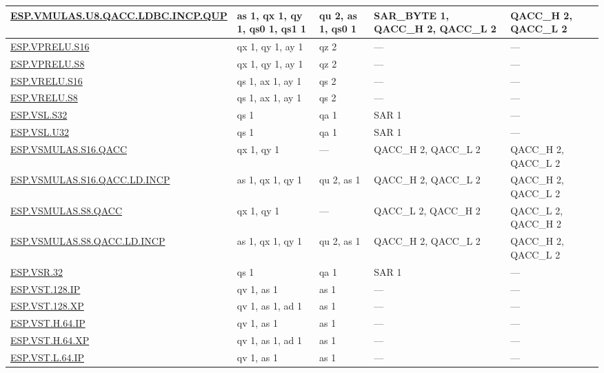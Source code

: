 \begin{longtable}[c]{|l|m{2.5cm}|m{2.5cm}|m{2.5cm}|m{2.5cm}|}
    \hyperref[instruction:ESPVMULASU8QACCLDBCINCPQUP]{ESP.VMULAS.U8.QACC.LDBC.INCP.QUP} & as 1, qx 1, qy 1, qs0 1, qs1 1 & qu 2, as 1, qs0 1 & SAR\_BYTE 1, QACC\_H 2, QACC\_L 2 & QACC\_H 2, QACC\_L 2\\\hline
    \hyperref[instruction:ESPVPRELUS16]{ESP.VPRELU.S16} & qx 1, qy 1, ay 1 & qz 2 & — & — \\\hline
    \hyperref[instruction:ESPVPRELUS8]{ESP.VPRELU.S8} & qx 1, qy 1, ay 1 & qz 2 & — & — \\\hline
    \hyperref[instruction:ESPVRELUS16]{ESP.VRELU.S16} & qs 1, ax 1, ay 1 & qs 2 & — & — \\\hline
    \hyperref[instruction:ESPVRELUS8]{ESP.VRELU.S8} & qs 1, ax 1, ay 1 & qs 2 & — & — \\\hline
    \hyperref[instruction:ESPVSLS32]{ESP.VSL.S32} & qs 1 & qa 1 & SAR 1 & — \\\hline
    \hyperref[instruction:ESPVSLU32]{ESP.VSL.U32} & qs 1 & qa 1 & SAR 1 & — \\\hline
    \hyperref[instruction:ESPVSMULASS16QACC]{ESP.VSMULAS.S16.QACC} & qx 1, qy 1 & — & QACC\_H 2, QACC\_L 2 & QACC\_H 2, QACC\_L 2\\\hline
    \hyperref[instruction:ESPVSMULASS16QACCLDINCP]{ESP.VSMULAS.S16.QACC.LD.INCP} & as 1, qx 1, qy 1 & qu 2, as 1 & QACC\_H 2, QACC\_L 2 & QACC\_H 2, QACC\_L 2\\\hline
    \hyperref[instruction:ESPVSMULASS8QACC]{ESP.VSMULAS.S8.QACC} & qx 1, qy 1 & — & QACC\_L 2, QACC\_H 2 & QACC\_L 2, QACC\_H 2\\\hline
    \hyperref[instruction:ESPVSMULASS8QACCLDINCP]{ESP.VSMULAS.S8.QACC.LD.INCP} & as 1, qx 1, qy 1 & qu 2, as 1 & QACC\_H 2, QACC\_L 2 & QACC\_H 2, QACC\_L 2\\\hline
    \hyperref[instruction:ESPVSR32]{ESP.VSR.32} & qs 1 & qa 1 & SAR 1 & — \\\hline
    \hyperref[instruction:ESPVST128IP]{ESP.VST.128.IP} & qv 1, as 1 & as 1 & — & — \\\hline
    \hyperref[instruction:ESPVST128XP]{ESP.VST.128.XP} & qv 1, as 1, ad 1 & as 1 & — & — \\\hline
    \hyperref[instruction:ESPVSTH64IP]{ESP.VST.H.64.IP} & qv 1, as 1 & as 1 & — & — \\\hline
    \hyperref[instruction:ESPVSTH64XP]{ESP.VST.H.64.XP} & qv 1, as 1, ad 1 & as 1 & — & — \\\hline
    \hyperref[instruction:ESPVSTL64IP]{ESP.VST.L.64.IP} & qv 1, as 1 & as 1 & — & — \\\hline

\end{longtable}
